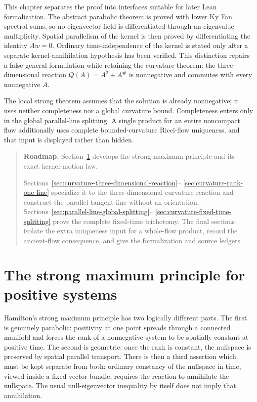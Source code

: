 \documentclass[10pt]{coll-l}
\newenvironment{roadmap}[1]{%
  \begin{quote}\small\noindent\textbf{Roadmap.} #1\par\medskip\noindent
}{\end{quote}}
\theoremstyle{definition}
\theoremstyle{remark}
\numberwithin{section}{chapter}
\numberwithin{equation}{chapter}
\begin{document}
This chapter separates the proof into interfaces suitable for later Lean
formalization.  The abstract parabolic theorem is proved with lower Ky Fan
spectral sums, so no eigenvector field is differentiated through an
eigenvalue multiplicity.  Spatial parallelism of the kernel is then proved
by differentiating the identity $Aw=0$.  Ordinary time-independence of the
kernel is stated only after a separate kernel-annihilation hypothesis has
been verified.  This distinction repairs a false general formulation while
retaining the curvature theorem: the three-dimensional reaction
$Q(A)=A^2+A^\#$ is nonnegative and commutes with every nonnegative $A$.

The local strong theorem assumes that the solution is already nonnegative;
it uses neither completeness nor a global curvature bound.  Completeness
enters only in the global parallel-line splitting.  A single product for an
entire noncompact flow additionally uses complete bounded-curvature
Ricci-flow uniqueness, and that input is displayed rather than hidden.

\begin{roadmap}{Section~\ref{sec:smp-abstract-systems} develops the
strong maximum principle and its exact kernel-motion law.}
Sections~\ref{sec:curvature-three-dimensional-reaction}--
\ref{sec:curvature-rank-one-line} specialize it to the three-dimensional
curvature reaction and construct the parallel tangent line without an
orientation.  Sections~\ref{sec:parallel-line-global-splitting}--
\ref{sec:curvature-fixed-time-splitting} prove the complete fixed-time
trichotomy.  The final sections isolate the extra uniqueness input for a
whole-flow product, record the ancient-flow consequence, and give the
formalization and source ledgers.
\end{roadmap}


\section{The strong maximum principle for positive systems}
\label{sec:smp-abstract-systems}

Hamilton's strong maximum principle has two logically different parts.
The first is genuinely parabolic: positivity at one point spreads through a
connected manifold and forces the rank of a nonnegative system to be
spatially constant at positive time.  The second is geometric: once the
rank is constant, the nullspace is preserved by spatial parallel transport.
There is then a third assertion which must be kept separate from both:
ordinary constancy of the nullspace in time, viewed inside a fixed vector
bundle, requires the reaction to annihilate the nullspace.  The usual
null-eigenvector inequality by itself does not imply that annihilation.
\end{document}
